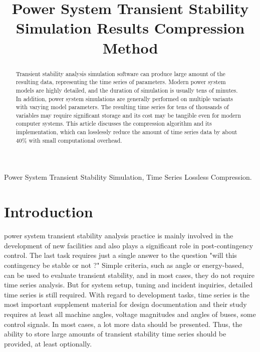 \documentclass[conference]{IEEEtran}
\begin{document}
\title{Power System Transient Stability Simulation Results Compression Method}

\author{
}

\maketitle

\begin{abstract}
	Transient stability analysis simulation software can produce large amount of
	the resulting data, representing the time series of parameters. Modern power system models
	are highly detailed, and the duration of simulation is usually tens of minutes. 
	In addition, power system simulations are generally performed on multiple variants with
	varying model parameters. The resulting time series for tens of thousands of variables
	may require significant storage and its cost may be tangible even for modern computer systems.
	This article discusses the compression algorithm and its implementation, which can 
	losslessly reduce the amount of time series data by about 40\% with small computational overhead.
\end{abstract}

\begin{IEEEkeywords}
	Power System Transient Stability Simulation, Time Series Lossless Compression.
\end{IEEEkeywords}

\section{Introduction}
 power system transient stability analysis practice is mainly involved
in the development of new facilities and also plays a significant role in post-contingency
control. The last task requires just a single answer to the question "will this contingency be stable or not ?"
Simple criteria, such as angle or energy-based, can be used to evaluate transient stability, and in 
most cases, they do not require time series analysis. But for system setup, tuning and incident inquiries, 
detailed time series is still required. With regard to development tasks, time series is the most important
supplement material for design documentation and their study requires at least all machine angles, 
voltage magnitudes and angles of buses, some control signals. In most cases, a lot more data should be presented. 
Thus, the ability to store large amounts of transient stability time series should be provided, at least optionally.
\end{document}
